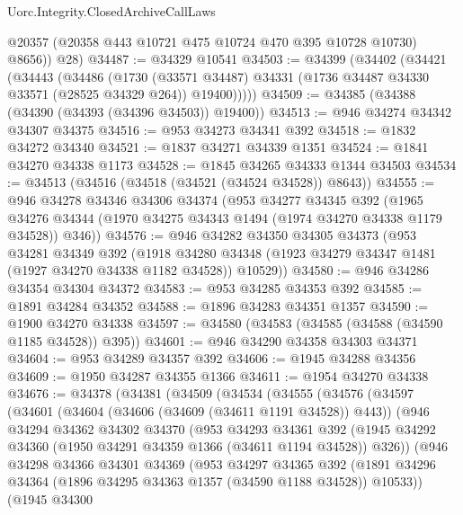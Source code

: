\begin{lexlean}{Uorc.Integrity.ClosedArchiveCallLaws}
\begin{coremodule}
        @20357 (@20358 @443 @10721 @475 @10724 @470 @395 @10728 @10730) @8656))
      @28)
@34487 := @34329 @10541
@34503 := @34399
    (@34402
      (@34421
        (@34443
          (@34486
            (@1730
              (@33571 @34487)
              @34331
              (@1736 @34487 @34330 @33571 (@28525 @34329 @264))
              @19400)))))
@34509 := @34385 (@34388 (@34390 (@34393 (@34396 @34503)) @19400))
@34513 := @946 @34274 @34342 @34307 @34375
@34516 := @953 @34273 @34341 @392
@34518 := @1832 @34272 @34340
@34521 := @1837 @34271 @34339 @1351
@34524 := @1841 @34270 @34338 @1173
@34528 := @1845 @34265 @34333 @1344 @34503
@34534 := @34513 (@34516 (@34518 (@34521 (@34524 @34528)) @8643))
@34555 := @946
    @34278
    @34346
    @34306
    @34374
    (@953
      @34277
      @34345
      @392
      (@1965 @34276 @34344 (@1970 @34275 @34343 @1494 (@1974 @34270 @34338 @1179 @34528)) @346))
@34576 := @946
    @34282
    @34350
    @34305
    @34373
    (@953
      @34281
      @34349
      @392
      (@1918 @34280 @34348 (@1923 @34279 @34347 @1481 (@1927 @34270 @34338 @1182 @34528)) @10529))
@34580 := @946 @34286 @34354 @34304 @34372
@34583 := @953 @34285 @34353 @392
@34585 := @1891 @34284 @34352
@34588 := @1896 @34283 @34351 @1357
@34590 := @1900 @34270 @34338
@34597 := @34580 (@34583 (@34585 (@34588 (@34590 @1185 @34528)) @395))
@34601 := @946 @34290 @34358 @34303 @34371
@34604 := @953 @34289 @34357 @392
@34606 := @1945 @34288 @34356
@34609 := @1950 @34287 @34355 @1366
@34611 := @1954 @34270 @34338
@34676 := @34378
    (@34381
      (@34509
        (@34534
          (@34555
            (@34576
              (@34597
                (@34601
                  (@34604 (@34606 (@34609 (@34611 @1191 @34528)) @443))
                  (@946
                    @34294
                    @34362
                    @34302
                    @34370
                    (@953
                      @34293
                      @34361
                      @392
                      (@1945 @34292 @34360 (@1950 @34291 @34359 @1366 (@34611 @1194 @34528)) @326))
                    (@946
                      @34298
                      @34366
                      @34301
                      @34369
                      (@953
                        @34297
                        @34365
                        @392
                        (@1891
                          @34296
                          @34364
                          (@1896 @34295 @34363 @1357 (@34590 @1188 @34528))
                          @10533))
                      (@1945
                        @34300

\end{coremodule}
\end{lexlean}
